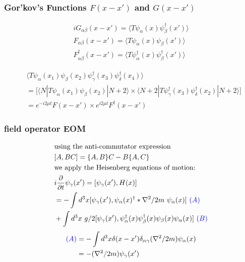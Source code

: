 \documentclass{beamer}
\begin{document}
\begin{frame}
\frametitle{Gor'kov's Functions $F(x-x')$ and $G(x-x')$}
\begin{eqnarray*}
iG_{\alpha\beta}(x-x') = \langle T \psi_{\alpha}(x) \psi^{\dagger}_{\beta}(x')\rangle \\
F_{\alpha\beta}(x-x') = \langle T\psi_{\alpha}(x) \psi_{\beta}(x')\rangle \\
F_{\alpha\beta}^{\dagger}(x-x') = \langle T\psi_{\alpha}^{\dagger}(x) \psi_{\beta}^{\dagger}(x')\rangle
\end{eqnarray*} 

\begin{eqnarray*}
& \langle T \psi_{\alpha}(x_1) \psi_{\beta}(x_2) \psi_{\gamma}^{\dagger}(x_3) \psi_{\delta}^{\dagger}(x_4) \rangle \\ 
& = \big[\langle N|T \psi_{\alpha}(x_1)\psi_{\beta}(x_2)|N+2\rangle \times \langle N+2|T \psi_{\gamma}^{\dagger}(x_3)\psi_{\delta}^{\dagger}(x_2)|N+2\rangle\big] \\
& = e^{-i2\mu t}F(x-x')\times e^{i2\mu t}F^{\dagger}(x-x')
\end{eqnarray*}

\end{frame}


\begin{frame}
\frametitle{field operator EOM}
\begin{eqnarray*}
&\text{using the anti-commutator expression} \\
& [A,BC] = \{A,B\}C - B\{A,C\} \\
&\text{we apply the Heisenberg equations of motion:} \\
& i\frac{\partial}{\partial t}\psi_{\gamma}(x') = [\psi_{\gamma}(x'), H(x)] \\
&= -\int d^3 x[\psi_{\gamma}(x'),\psi_{\alpha}(x)^{\dagger}*\nabla^2/2m \ \psi_{\alpha}(x)] \color{blue} \ (A)\\
& + \int d^3 x \ g/2[\psi_{\gamma}(x'), {\psi}^{\dagger}_{\alpha}(x){\psi}^{\dagger}_{\beta}(x){\psi}_{\beta}(x){\psi}_{\alpha}(x)] \ \color{blue} (B)
\end{eqnarray*}
\begin{eqnarray*}
\color{blue} (A) \color{black} &= -\int d^3 x\delta (x-x') \delta_{\alpha\gamma} (\nabla^2 /2m) \psi_{\alpha}(x) \\
& = -(\nabla^2 /2m) \psi_{\gamma}(x')
\end{eqnarray*}
\end{frame}
\end{document}
